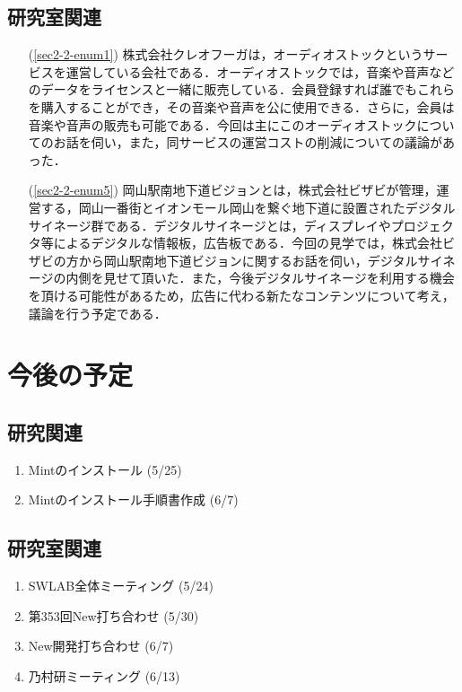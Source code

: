 \documentclass[fleqn, 14pt]{extarticle}
\begin{document}
\subsection{研究室関連}
\label{sec3-2}
\begin{itemize}
\item[(\ref{sec2-2-enum1})] 株式会社クレオフーガは，オーディオストックというサービスを運営している会社である．オーディオストックでは，音楽や音声などのデータをライセンスと一緒に販売している．会員登録すれば誰でもこれらを購入することができ，その音楽や音声を公に使用できる．さらに，会員は音楽や音声の販売も可能である．今回は主にこのオーディオストックについてのお話を伺い，また，同サービスの運営コストの削減についての議論があった．
\item[(\ref{sec2-2-enum5})] 岡山駅南地下道ビジョンとは，株式会社ビザビが管理，運営する，岡山一番街とイオンモール岡山を繋ぐ地下道に設置されたデジタルサイネージ群である．デジタルサイネージとは，ディスプレイやプロジェクタ等によるデジタルな情報板，広告板である．今回の見学では，株式会社ビザビの方から岡山駅南地下道ビジョンに関するお話を伺い，デジタルサイネージの内側を見せて頂いた．また，今後デジタルサイネージを利用する機会を頂ける可能性があるため，広告に代わる新たなコンテンツについて考え，議論を行う予定である．
\end{itemize}

\section{今後の予定}
\label{sec4}
\subsection{研究関連}
\label{sec4-1}
\begin{enumerate}
\item Mintのインストール
  \hfill
  \label{sec4-1-enum1}
  (5/25)
\item Mintのインストール手順書作成
  \hfill
  \label{sec4-1-enum2}
  (6/7)
\end{enumerate}

\subsection{研究室関連}
\label{sec4-2}
\begin{enumerate}
\item SWLAB全体ミーティング
  \hfill
  \label{sec4-2-enum0}
  (5/24)
\item 第353回New打ち合わせ
  \hfill
  \label{sec4-2-enum1}
  (5/30)
  \item New開発打ち合わせ
  \hfill
  \label{sec4-2-enum2}
  (6/7)
\item 乃村研ミーティング
  \hfill
  \label{sec4-2-enum3}
  (6/13)

\end{enumerate}
\end{document}
